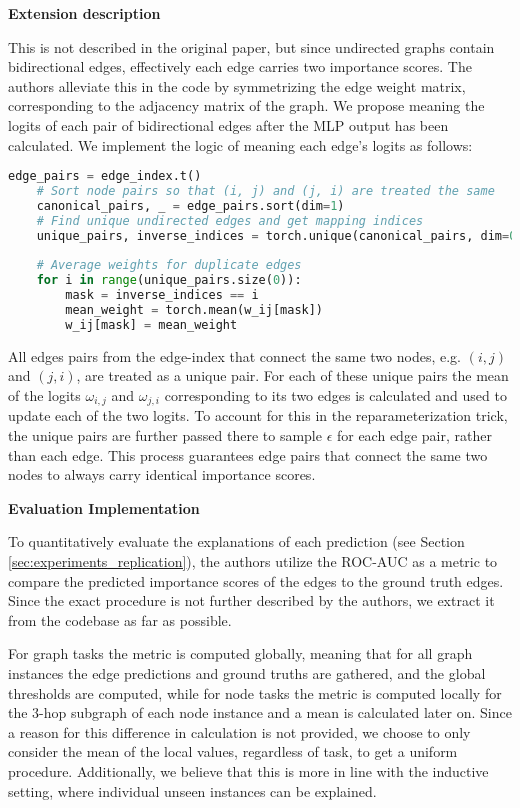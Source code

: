 \textbf{Extension description}\par
This is not described in the original paper, but since undirected graphs contain bidirectional edges, effectively each edge carries two importance scores. The authors alleviate this in the code by symmetrizing the edge weight matrix, corresponding to the adjacency matrix of the graph. We propose meaning the logits of each pair of bidirectional edges after the MLP output has been calculated. We implement the logic of meaning each edge's logits as follows: 
\begin{lstlisting}[language=Python, caption=Implementation of meaning bidirectional edge weights, label=lst:edge_meaning]
    edge_pairs = edge_index.t()
    # Sort node pairs so that (i, j) and (j, i) are treated the same
    canonical_pairs, _ = edge_pairs.sort(dim=1)
    # Find unique undirected edges and get mapping indices
    unique_pairs, inverse_indices = torch.unique(canonical_pairs, dim=0)
    
    # Average weights for duplicate edges
    for i in range(unique_pairs.size(0)):
        mask = inverse_indices == i
        mean_weight = torch.mean(w_ij[mask])
        w_ij[mask] = mean_weight
\end{lstlisting}
All edges pairs from the edge-index that connect the same two nodes, e.g. $(i,j)$ and $(j,i)$, are treated as a unique pair. For each of these unique pairs the mean of the logits $\omega_{i,j}$ and $\omega_{j,i}$ corresponding to its two edges is calculated and used to update each of the two logits. To account for this in the reparameterization trick, the unique pairs are further passed there to sample $\epsilon$ for each edge pair, rather than each edge. This process guarantees edge pairs that connect the same two nodes to always carry identical importance scores. \bigskip

\textbf{Evaluation Implementation}\par
To quantitatively evaluate the explanations of each prediction (see Section \ref{sec:experiments_replication}), the authors utilize the ROC-AUC as a metric to compare the predicted importance scores of the edges to the ground truth edges. Since the exact procedure is not further described by the authors, we extract it from the codebase as far as possible.

For graph tasks the metric is computed globally, meaning that for all graph instances the edge predictions and ground truths are gathered, and the global thresholds are computed, while for node tasks the metric is computed locally for the $3$-hop subgraph of each node instance and a mean is calculated later on.
Since a reason for this difference in calculation is not provided, we choose to only consider the mean of the local values, regardless of task, to get a uniform procedure. Additionally, we believe that this is more in line with the inductive setting, where individual unseen instances can be explained.

